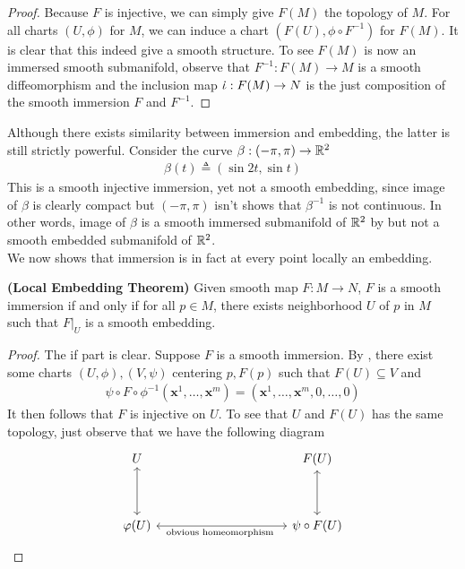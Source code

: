 \documentclass{report}
\begin{document}
\begin{proof}
Because $F$ is injective,  we can simply give $F(M)$ the topology of $M$. For all charts $(U,\phi)$ for $M$, we can induce a chart $(F(U),\phi \circ F^{-1})$ for $F(M)$. It is clear that this indeed give a smooth structure. To see $F(M)$ is now an immersed smooth submanifold, observe that $F^{-1}:F(M)\rightarrow M$ is a smooth diffeomorphism and the inclusion map $\dot{\iota}:F(M)\rightarrow N $ is the just composition of the smooth immersion  $F$ and $F^{-1}$. 
\end{proof}
\begin{mdframed}
Although there exists similarity between immersion and embedding, the latter is still strictly powerful. Consider the curve $\beta :(- \pi ,\pi)\rightarrow \mathbb{R}^2 $ 
\begin{align*}
\beta  (t)\triangleq (\sin 2t, \sin t)
\end{align*}
This is a smooth injective immersion, yet not a smooth embedding, since image of $\beta $ is clearly compact but $(-\pi, \pi)$ isn't shows that $\beta ^{-1}$ is not continuous. In other words, image of  $\beta $ is a smooth immersed submanifold of $\mathbb{R}^2$ by  but not a smooth embedded submanifold of $\mathbb{R}^2$.\\

We now shows that immersion is in fact at every point locally an embedding.  
\end{mdframed}
\begin{theorem}
\label{Local Embedding Theorem}
\textbf{(Local Embedding Theorem)} Given smooth map $F:M\rightarrow N$, $F$ is a smooth immersion if and only if for all  $p \in M$, there exists neighborhood $U$ of  $p$ in  $M$ such that  $F|_U$ is a smooth embedding. 
\end{theorem}
\begin{proof}
The if part is clear. Suppose $F$ is a smooth immersion. By , there exist some charts $(U,\phi),(V,\psi)$ centering $p,F(p)$ such that $F(U)\subseteq V$ and  
\begin{align*}
\psi \circ F \circ \phi^{-1}(\textbf{x}^1, \dots ,\textbf{x}^m)=(\textbf{x}^1,\dots ,\textbf{x}^m,0,\dots ,0)
\end{align*}
It then follows that $F$ is injective on  $U$. To see that  $U$ and  $F(U)$ has the same topology, just observe that we have the following diagram
\[\begin{tikzcd}
    U &&&& {F(U)} \\
    \\
    {\varphi(U)} && {} && {\psi \circ F(U)}
    \arrow[leftrightarrow, from=1-1, to=3-1]
    \arrow[leftrightarrow, from=1-5, to=3-5]
    \arrow["{\text{obvious homeomorphism }}"', leftrightarrow, from=3-1, to=3-5]
\end{tikzcd}\]
\end{proof}
\end{document}
